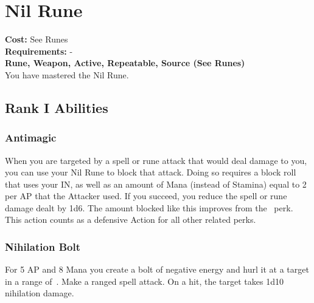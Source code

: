 \section{Nil Rune}\label{rune:nil}
\textbf{Cost:} See Runes\\
\textbf{Requirements:} -\\
\textbf{Rune, Weapon, Active, Repeatable, Source (See Runes)}\\
You have mastered the Nil Rune.

\subsection{Rank I Abilities}

\subsubsection{Antimagic}
When you are targeted by a spell or rune attack that would deal damage to you, you can use your Nil Rune to block that attack.
Doing so requires a block roll that uses your IN, as well as an amount of Mana (instead of Stamina) equal to 2 per AP that the Attacker used.
If you succeed, you reduce the spell or rune damage dealt by 1d6.
The amount blocked like this improves from the~ perk.
This action counts as a defensive Action for all other related perks.

\subsubsection{Nihilation Bolt}
For 5 AP and 8 Mana you create a bolt of negative energy and hurl it at a target in a range of~.
Make a ranged spell attack.
On a hit, the target takes 1d10 nihilation damage.
